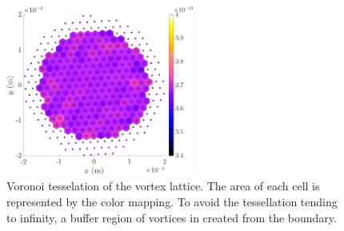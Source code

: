 \begin{figure}\centering
    \includegraphics[width=0.55\textwidth]{Images/ch4_vtx/Voronoi_area_VTXLATT}
    \caption{Voronoi tesselation of the vortex lattice. The area of each cell is represented by the color mapping. To avoid the tessellation tending to infinity, a buffer region of vortices in created from the boundary. }\label{fig:voron_vtxlatt}
\end{figure}
